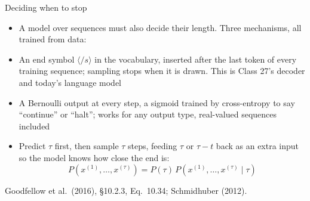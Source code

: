 \documentclass[aspectratio=169, 11pt]{beamer}
\newcommand{\srcline}[1]{%
  \par\vspace{0.25em}%
  {\scriptsize\color{mcMuted}\hfill #1\par}}
\newcommand{\src}[3]{}      %
\begin{document}
\begin{frame}{Deciding when to stop}
  \src{goodfellow2016}{equation}{10.34}
  \src{goodfellow2016}{section}{10.2.3}
  \vspace{0.05em}
  {\footnotesize
  \begin{itemize}\itemsep0.3em
    \item A model over sequences must also decide their \alert{length}.
          Three mechanisms, all trained from data:
    \item \alert{An end symbol} $\langle/s\rangle$ in the vocabulary, inserted
          after the last token of every training sequence; sampling stops
          when it is drawn. This is Class 27's decoder and today's language
          model
    \item \alert{A Bernoulli output} at every step, a sigmoid trained by
          cross-entropy to say ``continue'' or ``halt''; works for any
          output type, real-valued sequences included
    \item \alert{Predict $\tau$ first}, then sample $\tau$ steps, feeding
          $\tau$ or $\tau - t$ back as an extra input so the model knows how
          close the end is:
          \[
            P(x^{(1)}, \ldots, x^{(\tau)}) = P(\tau)\,P(x^{(1)}, \ldots, x^{(\tau)} \mid \tau)
          \]
  \end{itemize}}
  \srcline{Goodfellow et al.\ (2016), \S10.2.3, Eq.~10.34; Schmidhuber (2012).}
\end{frame}
\end{document}
